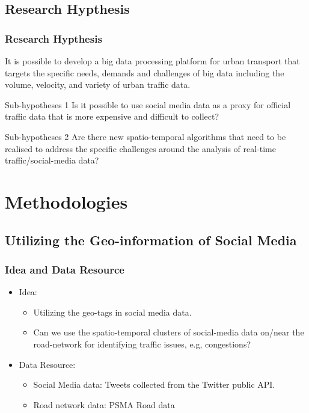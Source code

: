 \subsection{Research Hypthesis}

\begin{frame}
    \frametitle{Research Hypthesis}
    It is possible to develop a big data processing platform for urban transport that targets the specific needs, demands and challenges of big data including the volume, velocity, and variety of urban traffic data.

    \begin{block}{Sub-hypotheses 1}
    Is it possible to use social media data as a proxy for official traffic data that is more expensive and difficult to collect?
    \end{block}
    \begin{block}{Sub-hypotheses 2}
    Are there new spatio-temporal algorithms that need to be realised to address the specific challenges around the analysis of real-time traffic/social-media data?
    \end{block}
\end{frame}

\section{Methodologies}

\subsection{Utilizing the Geo-information of Social Media}
\begin{frame}
    \frametitle{Idea and Data Resource}
    \begin{itemize}
	    \item Idea:
	    \begin{itemize}
	        \item Utilizing the geo-tags in social media data.
	        \item Can we use the spatio-temporal clusters of social-media data on/near the road-network for identifying traffic issues, e.g, congestions?
	    \end{itemize}
	    \item Data Resource:
	    \begin{itemize}
	        \item Social Media data: Tweets collected from the Twitter public API.
	        \item Road network data: PSMA Road data
	    \end{itemize}
    \end{itemize}
\end{frame}

